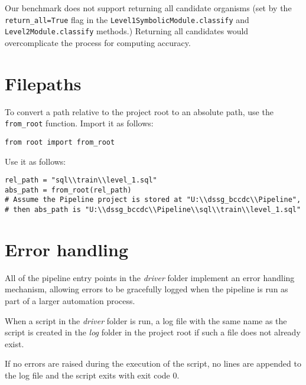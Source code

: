 \documentclass[a4paper]{article}
\begin{document}
Our benchmark does not support returning all candidate organisms (set by the \lstinline{return_all=True} flag in the \lstinline{Level1SymbolicModule.classify} and \lstinline{Level2Module.classify} methods.) Returning all candidates would overcomplicate the process for computing accuracy.

\section{Filepaths}

To convert a path relative to the project root to an absolute path, use the \lstinline{from_root} function. Import it as follows:

\lstset{language=Python}
\begin{lstlisting}
from root import from_root
\end{lstlisting}
\lstset{language=}

Use it as follows:

\lstset{language=Python}
\begin{lstlisting}
rel_path = "sql\\train\\level_1.sql"
abs_path = from_root(rel_path)
# Assume the Pipeline project is stored at "U:\\dssg_bccdc\\Pipeline",
# then abs_path is "U:\\dssg_bccdc\\Pipeline\\sql\\train\\level_1.sql"
\end{lstlisting}
\lstset{language=}

\section{Error handling} \label{error_handling}

All of the pipeline entry points in the \textit{driver} folder implement an error handling mechanism, allowing errors to be gracefully logged when the pipeline is run as part of a larger automation process.

When a script in the \textit{driver} folder is run, a log file with the same name as the script is created in the \textit{log} folder in the project root if such a file does not already exist.

If no errors are raised during the execution of the script, no lines are appended to the log file and the script exits with exit code 0.
\end{document}
